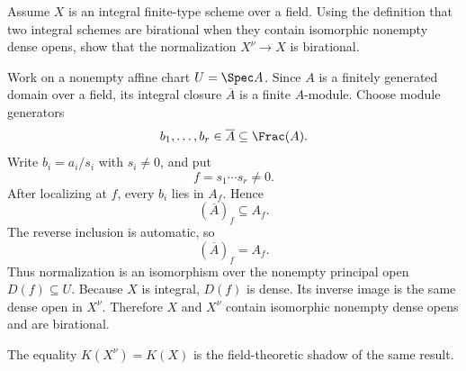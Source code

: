 \begin{problem}\label{prob:vi28-10}
Assume \(X\) is an integral finite-type scheme over a field. Using the definition that two integral schemes are birational when they contain isomorphic nonempty dense opens, show that the normalization \(X^\nu\to X\) is birational.

\end{problem}

\ifdefined\FullProblemDossiers
\begin{solution}
Work on a nonempty affine chart \(U=\Spec A\). Since \(A\) is a finitely generated domain over a field, its integral closure \(\overline A\) is a finite \(A\)-module. Choose module generators
\[
b_1,\ldots,b_r\in\overline A\subseteq\Frac(A).
\]
Write \(b_i=a_i/s_i\) with \(s_i\ne0\), and put
\[
f=s_1\cdots s_r\ne0.
\]
After localizing at \(f\), every \(b_i\) lies in \(A_f\). Hence
\[
(\overline A)_f\subseteq A_f.
\]
The reverse inclusion is automatic, so
\[
(\overline A)_f=A_f.
\]
Thus normalization is an isomorphism over the nonempty principal open \(D(f)\subseteq U\). Because \(X\) is integral, \(D(f)\) is dense. Its inverse image is the same dense open in \(X^\nu\). Therefore \(X\) and \(X^\nu\) contain isomorphic nonempty dense opens and are birational.

The equality \(K(X^\nu)=K(X)\) is the field-theoretic shadow of the same result.
\end{solution}
\fi
